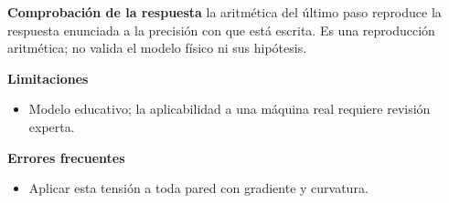 \documentclass[10pt,openany]{book}
\begin{document}
\begin{tcolorbox}[title={Problema resuelto 4}, studiumworked, breakable]
\noindent\textbf{Comprobación de la respuesta} la aritmética del último paso reproduce la respuesta enunciada a la precisión con que está escrita. Es una reproducción aritmética; no valida el modelo físico ni sus hipótesis.

\noindent\textbf{Limitaciones}
\begin{itemize}
\item Modelo educativo; la aplicabilidad a una máquina real requiere revisión experta.
\end{itemize}

\noindent\textbf{Errores frecuentes}
\begin{itemize}
\item Aplicar esta tensión a toda pared con gradiente y curvatura.
\end{itemize}
\end{tcolorbox}
\end{document}
